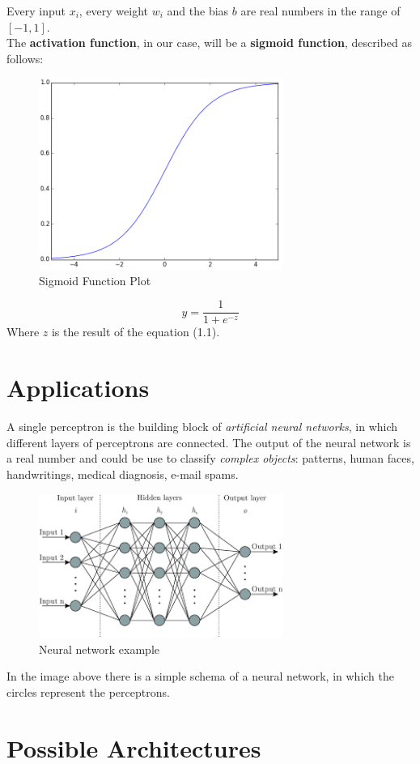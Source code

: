 Every input $x_{i}$, every weight $w_{i}$ and the bias $b$ are real numbers in the range of $[-1, 1]$. \\
The \textbf{activation function}, in our case, will be a \textbf{sigmoid function}, described as follows:
\begin{figure}[h]
	\centering
	\caption{Sigmoid Function Plot}
	\includegraphics[width=8cm]{img/sigmoid.png}
\end{figure}
\begin{equation}
	y = \dfrac{1}{1+e^{-z}}
\end{equation}
Where $z$ is the result of the equation (1.1).
\section{Applications}
A single perceptron is the building block of \textit{artificial neural networks}, in which different layers of perceptrons are connected. The output of the neural network is a real number and could be use to classify \textit{complex objects}: patterns, human faces, handwritings, medical diagnosis, e-mail spams.\\
\begin{figure}[H]
	\centering
	\caption{Neural network example}
	\includegraphics[width=8cm]{img/neural_network.png}
\end{figure}
In the image above there is a simple schema of a neural network, in which the circles represent the perceptrons.
\section{Possible Architectures}

